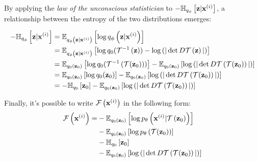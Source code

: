 By applying the \emph{law of the unconscious statistician} to $-\entropyqzcondi$,
a relationship between the entropy of the two distributions emerges:

\begin{align}
     -\entropyqzcondi &= \expectqphi{\logqzcondi}\\
    &= \expectqphi{\log q_0(\trinv{\boldz}) - \log \left( |\detDtr{\boldz}| \right)}\\
    &= \expectqzero{\log q_0(\trinv{\tr(\boldzzero)})}
       - \expectqzero{\log \left( |\detDtr{\tr(\boldzzero)}| \right)}\\
    &= \expectqzero{\log q_0(\boldzzero)}
       - \expectqzero{\log \left( |\detDtr{\tr(\boldzzero)}| \right)}\\
    &= - \entropyqzero - \expectqzero{\log \left( |\detDtr{\tr(\boldzzero)}| \right)}
\end{align}

Finally, it's possible to write $\freeenergyxi$ in the following form:
\begin{align}
\freeenergyxi = &- \expectqzero{\logpxicondtr} \\
    &- \expectqzero{\logptr} \\
    &- \entropyqzero \\
    &- \expectqzero{\log \left( |\detDtr{\tr(\boldzzero)}| \right)}
\end{align}


